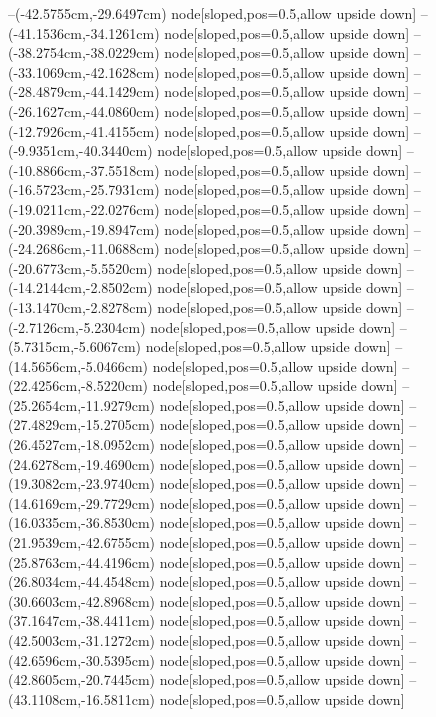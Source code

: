 --(-42.5755cm,-29.6497cm) node[sloped,pos=0.5,allow upside down]{\ArrowIn}
--(-41.1536cm,-34.1261cm) node[sloped,pos=0.5,allow upside down]{\ArrowIn}
--(-38.2754cm,-38.0229cm) node[sloped,pos=0.5,allow upside down]{\ArrowIn}
--(-33.1069cm,-42.1628cm) node[sloped,pos=0.5,allow upside down]{\ArrowIn}
--(-28.4879cm,-44.1429cm) node[sloped,pos=0.5,allow upside down]{\ArrowIn}
--(-26.1627cm,-44.0860cm) node[sloped,pos=0.5,allow upside down]{\ArrowIn}
--(-12.7926cm,-41.4155cm) node[sloped,pos=0.5,allow upside down]{\ArrowIn}
--(-9.9351cm,-40.3440cm) node[sloped,pos=0.5,allow upside down]{\ArrowIn}
--(-10.8866cm,-37.5518cm) node[sloped,pos=0.5,allow upside down]{\ArrowIn}
--(-16.5723cm,-25.7931cm) node[sloped,pos=0.5,allow upside down]{\ArrowIn}
--(-19.0211cm,-22.0276cm) node[sloped,pos=0.5,allow upside down]{\ArrowIn}
--(-20.3989cm,-19.8947cm) node[sloped,pos=0.5,allow upside down]{\ArrowIn}
--(-24.2686cm,-11.0688cm) node[sloped,pos=0.5,allow upside down]{\ArrowIn}
--(-20.6773cm,-5.5520cm) node[sloped,pos=0.5,allow upside down]{\ArrowIn}
--(-14.2144cm,-2.8502cm) node[sloped,pos=0.5,allow upside down]{\ArrowIn}
--(-13.1470cm,-2.8278cm) node[sloped,pos=0.5,allow upside down]{\ArrowIn}
--(-2.7126cm,-5.2304cm) node[sloped,pos=0.5,allow upside down]{\ArrowIn}
--(5.7315cm,-5.6067cm) node[sloped,pos=0.5,allow upside down]{\ArrowIn}
--(14.5656cm,-5.0466cm) node[sloped,pos=0.5,allow upside down]{\ArrowIn}
--(22.4256cm,-8.5220cm) node[sloped,pos=0.5,allow upside down]{\ArrowIn}
--(25.2654cm,-11.9279cm) node[sloped,pos=0.5,allow upside down]{\ArrowIn}
--(27.4829cm,-15.2705cm) node[sloped,pos=0.5,allow upside down]{\ArrowIn}
--(26.4527cm,-18.0952cm) node[sloped,pos=0.5,allow upside down]{\ArrowIn}
--(24.6278cm,-19.4690cm) node[sloped,pos=0.5,allow upside down]{\ArrowIn}
--(19.3082cm,-23.9740cm) node[sloped,pos=0.5,allow upside down]{\ArrowIn}
--(14.6169cm,-29.7729cm) node[sloped,pos=0.5,allow upside down]{\ArrowIn}
--(16.0335cm,-36.8530cm) node[sloped,pos=0.5,allow upside down]{\ArrowIn}
--(21.9539cm,-42.6755cm) node[sloped,pos=0.5,allow upside down]{\ArrowIn}
--(25.8763cm,-44.4196cm) node[sloped,pos=0.5,allow upside down]{\ArrowIn}
--(26.8034cm,-44.4548cm) node[sloped,pos=0.5,allow upside down]{\arrowIn}
--(30.6603cm,-42.8968cm) node[sloped,pos=0.5,allow upside down]{\ArrowIn}
--(37.1647cm,-38.4411cm) node[sloped,pos=0.5,allow upside down]{\ArrowIn}
--(42.5003cm,-31.1272cm) node[sloped,pos=0.5,allow upside down]{\ArrowIn}
--(42.6596cm,-30.5395cm) node[sloped,pos=0.5,allow upside down]{\arrowIn}
--(42.8605cm,-20.7445cm) node[sloped,pos=0.5,allow upside down]{\ArrowIn}
--(43.1108cm,-16.5811cm) node[sloped,pos=0.5,allow upside down]{\ArrowIn}

